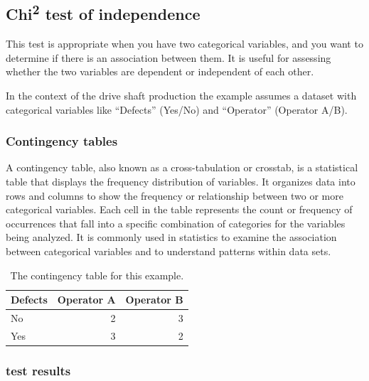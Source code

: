 \documentclass[
  a4paper,
]{scrbook}
\begin{document}
\subsection{\texorpdfstring{Chi\textsuperscript{2} test of
independence}{Chi2 test of independence}}\label{chi2-test-of-independence}

This test is appropriate when you have two categorical variables, and
you want to determine if there is an association between them. It is
useful for assessing whether the two variables are dependent or
independent of each other.

In the context of the drive shaft production the example assumes a
dataset with categorical variables like ``Defects'' (Yes/No) and
``Operator'' (Operator A/B).

\subsubsection{Contingency tables}\label{contingency-tables}

A contingency table, also known as a cross-tabulation or crosstab, is a
statistical table that displays the frequency distribution of variables.
It organizes data into rows and columns to show the frequency or
relationship between two or more categorical variables. Each cell in the
table represents the count or frequency of occurrences that fall into a
specific combination of categories for the variables being analyzed. It
is commonly used in statistics to examine the association between
categorical variables and to understand patterns within data sets.

\begin{longtable}[]{@{}lrr@{}}

\caption{\label{tbl-chi-sq-indep-tbl}The contingency table for this
example.}

\tabularnewline

\toprule\noalign{}
Defects & Operator A & Operator B \\
\midrule\noalign{}
\endhead
\bottomrule\noalign{}
\endlastfoot
{No} & 2 & 3 \\
{Yes} & 3 & 2 \\

\end{longtable}

\subsubsection{test results}\label{test-results}
\end{document}
